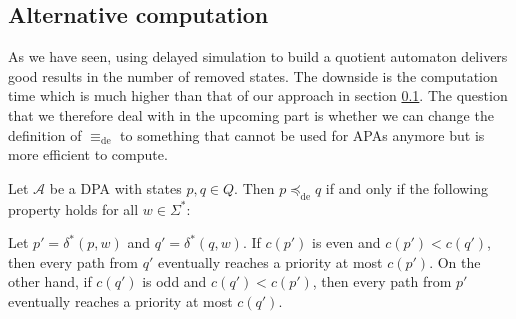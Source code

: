 
\subsection{Alternative computation}
As we have seen, using delayed simulation to build a quotient automaton delivers good results in the number of removed states. The downside is the computation time which is much higher than that of our approach in section \ref{}. The question that we therefore deal with in the upcoming part is whether we can change the definition of $\equiv_\text{de}$ to something that cannot be used for APAs anymore but is more efficient to compute.


\begin{lem}
\label{lem:fwe:preceq_alternative}
	Let $\mathcal{A}$ be a DPA with states $p, q \in Q$. Then $p \preceq_\text{de} q$ if and only if the following property holds for all $w \in \Sigma^*$: 
	
	Let $p' = \delta^*(p, w)$ and $q' = \delta^*(q, w)$. If $c(p')$ is even and $c(p') < c(q')$, then every path from $q'$ eventually reaches a priority at most $c(p')$. On the other hand, if $c(q')$ is odd and $c(q') < c(p')$, then every path from $p'$ eventually reaches a priority at most $c(q')$.
\end{lem}

